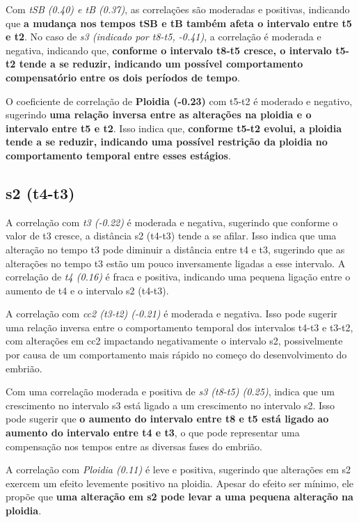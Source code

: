 Com \textit{tSB (0.40) e tB (0.37)}, as correlações são moderadas e positivas, indicando que \textbf{a mudança nos tempos tSB e tB também afeta o intervalo entre t5 e t2}. No caso de \textit{s3 (indicado por t8-t5, -0.41)}, a correlação é moderada e negativa, indicando que, \textbf{conforme o intervalo t8-t5 cresce, o intervalo t5-t2 tende a se reduzir, indicando um possível comportamento compensatório entre os dois períodos de tempo}.

O coeficiente de correlação de \textbf{Ploidia (-0.23)} com t5-t2 é moderado e negativo, sugerindo \textbf{uma relação inversa entre as alterações na ploidia e o intervalo entre t5 e t2}. Isso indica que, \textbf{conforme t5-t2 evolui, a ploidia tende a se reduzir, indicando uma possível restrição da ploidia no comportamento temporal entre esses estágios}. 

\subsection*{s2 (t4-t3)}
A correlação com \textit{t3 (-0.22)} é moderada e negativa, sugerindo que conforme o valor de t3 cresce, a distância s2 (t4-t3) tende a se afilar. Isso indica que uma alteração no tempo t3 pode diminuir a distância entre t4 e t3, sugerindo que as alterações no tempo t3 estão um pouco inversamente ligadas a esse intervalo. A correlação de \textit{t4 (0.16)} é fraca e positiva, indicando uma pequena ligação entre o aumento de t4 e o intervalo s2 (t4-t3). 

A correlação com \textit{cc2 (t3-t2) (-0.21)} é moderada e negativa. Isso pode sugerir uma relação inversa entre o comportamento temporal dos intervalos t4-t3 e t3-t2, com alterações em cc2 impactando negativamente o intervalo s2, possivelmente por causa de um comportamento mais rápido no começo do desenvolvimento do embrião.

Com uma correlação moderada e positiva de \textit{s3 (t8-t5) (0.25)}, indica que um crescimento no intervalo s3 está ligado a um crescimento no intervalo s2. Isso pode sugerir que \textbf{o aumento do intervalo entre t8 e t5 está ligado ao aumento do intervalo entre t4 e t3}, o que pode representar uma compensação nos tempos entre as diversas fases do embrião.

A correlação com \textit{Ploidia (0.11)} é leve e positiva, sugerindo que alterações em s2 exercem um efeito levemente positivo na ploidia. Apesar do efeito ser mínimo, ele propõe que \textbf{uma alteração em s2 pode levar a uma pequena alteração na ploidia}.

